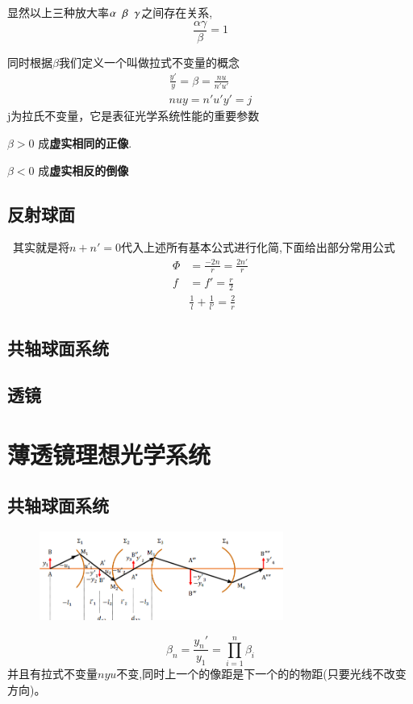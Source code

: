 显然以上三种放大率$\alpha \hspace{0.2cm}  \beta\hspace{0.2cm}   \gamma$之间存在关系,
\begin{equation}
\frac{\alpha \gamma}{\beta}=1\tag{1.2.24}
\end{equation}
\begin{description}[leftmargin=0.7cm,style=nextline,nosep]%
    \item[拉式不变量] 同时根据$\beta$我们定义一个叫做拉式不变量的概念
    \begin{align}
    \frac{y'}{y}=\beta=\frac{nu}{n'u'}    \tag{1.2.25.bef 1}\\
      nuy=n'u'y'=j  \tag{1.2.25}
    \end{align}
    j为拉氏不变量，它是表征光学系统性能的重要参数

    $\beta>0$ 成\textbf{虚实相同的正像}. 
    
    $\beta<0$ 成\textbf{虚实相反的倒像}
\end{description}

\subsection{反射球面}\
其实就是将$n+n'=0$代入上述所有基本公式进行化简,下面给出部分常用公式
\begin{align}
\Phi&=\frac{-2n}{r}=\frac{2n'}{r} \tag{1.2.26} \\
f&=f'=\frac{r}{2} \tag{1.2.27} \\
&\frac{1}{l}+\frac{1}{l'}=\frac{2}{r} \tag{1.2.28}
\end{align}
\subsection{共轴球面系统}
\subsection{透镜}
\section{薄透镜理想光学系统}
\subsection{共轴球面系统}
        \begin{figure}[H]
            \centering
            \includegraphics[width=8cm]{img/1.4.png}
            \end{figure}
\begin{equation}
\beta_n=\frac{y_n'}{y_1}=\prod_{i=1}^n \beta_i \tag{2.1.1}
\end{equation}
并且有拉式不变量$nyu$不变,同时上一个的像距是下一个的的物距(只要光线不改变方向)。
